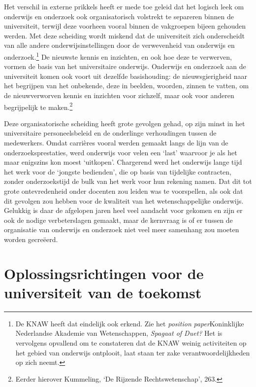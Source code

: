 \documentclass[smallauthor, chapterhaspagenum, nochapterinheader, pagenuminheader,  bigchapnum,medium2, tocpages, garamond, titleinheader]{jote-book}
\begin{document}
	Het verschil in externe prikkels heeft er mede toe geleid dat het logisch leek om onderwijs en onderzoek ook organisatorisch volstrekt te separeren binnen de universiteit, terwijl deze voorheen vooral binnen de vakgroepen bijeen gehouden werden. Met deze scheiding wordt miskend dat de universiteit zich onderscheidt van alle andere onderwijsinstellingen door de verwevenheid van onderwijs en onderzoek.\footnote{De KNAW heeft dat eindelijk ook erkend. Zie het \emph{position}\emph{ }\emph{paper}Koninklijke Nederlandse Akademie van Wetenschappen, \emph{Spagaat of Duet? }Het is vervolgens opvallend om te constateren dat de KNAW weinig activiteiten op het gebied van onderwijs ontplooit, laat staan ter zake verantwoordelijkheden op zich neemt.} De nieuwste kennis en inzichten, en ook hoe deze te verwerven, vormen de basis van het universitaire onderwijs. Onderwijs en onderzoek aan de universiteit komen ook voort uit dezelfde basishouding: de nieuwsgierigheid naar het begrijpen van het onbekende, deze in beelden, woorden, zinnen te vatten, om de nieuwverworven kennis en inzichten voor zichzelf, maar ook voor anderen begrijpelijk te maken.\footnote{Eerder hierover Kummeling, ‘De Rijzende Rechtswetenschap', 263.}



	Deze organisatorische scheiding heeft grote gevolgen gehad, op zijn minst in het universitaire personeelsbeleid en de onderlinge verhoudingen tussen de medewerkers. Omdat carrières vooral werden gemaakt langs de lijn van de onderzoeksprestaties, werd onderwijs voor velen een ‘last' waarvoor je als het maar enigszins kon moest ‘uitkopen'. Chargerend werd het onderwijs lange tijd het werk voor de ‘jongste bedienden', die op basis van tijdelijke contracten, zonder onderzoekstijd de bulk van het werk voor hun rekening namen. Dat dit tot grote ontevredenheid onder docenten zou leiden was te voorspellen, als ook dat dit gevolgen zou hebben voor de kwaliteit van het wetenschappelijke onderwijs. Gelukkig is daar de afgelopen jaren heel veel aandacht voor gekomen en zijn er ook de nodige verbeterslagen gemaakt, maar de kernvraag is of er tussen de organisatie van onderwijs en onderzoek niet veel meer samenhang zou moeten worden gecreëerd.



	\section{Oplossingsrichtingen voor de universiteit van de toekomst}
\end{document}
